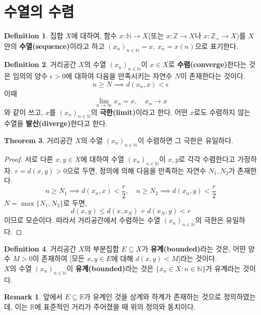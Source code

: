 \documentclass[11pt]{book}
\numberwithin{equation}{chapter}
\def\NN{\mathbb{N}}
\def\ZZ{\mathbb{Z}}
\def\RR{\mathbb{R}}
\def\eps{\epsilon}
\theoremstyle{definition}
\newtheorem{thm}{Theorem}[section]
\newtheorem{defn}[thm]{Definition}
\newtheorem*{rem}{Remark}
\begin{document}
\section{수열의 수렴}

    \begin{defn}
        집합 \(X\)에 대하여, 함수 \(x : \NN \to X\)(또는 \(x : \ZZ \to X\)나 \(x : \ZZ_+ \to X\))를 \(X\) 안의 \textbf{수열(sequence)}이라고 하고 \((x_n)_{n \in \NN} = x, \ x_n = x(n)\)으로 표기한다.
    \end{defn}
    \begin{defn}
        거리공간 \(X\)의 수열 \((x_n)_{n \in \NN}\)이 \(x \in X\)로 \textbf{수렴(converge)}한다는 것은 임의의 양수 \(\eps > 0\)에 대하여 다음을 만족시키는 자연수 \(N\)이 존재한다는 것이다.
        \[
        n \ge N \implies d(x_n, x) < \eps    
        \]
        이때
        \[
        \lim_{n \to \infty} x_n = x, \quad x_n \to x    
        \]
        와 같이 쓰고, \(x\)를 \((x_n)_{n \in \NN}\)의 \textbf{극한(limit)}이라고 한다. 어떤 \(x\)로도 수렴하지 않는 수열을 \textbf{발산(diverge)}한다고 한다.
    \end{defn}


    \begin{thm}
        거리공간 \(X\)의 수열 \((x_n)_{n \in \NN}\)이 수렴하면 그 극한은 유일하다.
    \end{thm}
    \begin{proof}
        서로 다른 \(x, y \in X\)에 대하여 수열 \((x_n)_{n \in \NN}\)이 \(x, y\)로 각각 수렴한다고 가정하자. \(r = d(x, y) > 0\)으로 두면, 정의에 의해 다음을 만족하는 자연수 \(N_1, N_2\)가 존재한다.
        \[
        n \ge N_1 \implies d(x_n, x) < \frac{r}{2}, \quad n \ge N_2 \implies d(x_n, y) < \frac{r}{2}
        \]
        \(N = \max \{N_1, N_2\}\)로 두면,
        \[
        d(x, y) \le d(x, x_N) + d(x_N, y) < r    
        \]
        이므로 모순이다. 따라서 거리공간에서 수렴하는 수열 \((x_n)_{n \in \NN}\)의 극한은 유일하다.
    \end{proof}

    \begin{defn}
        거리공간 \(X\)의 부분집합 \(E \subseteq X\)가 \textbf{유계(bounded)}라는 것은, 어떤 양수 \(M > 0\)이 존재하여 [모든 \(x, y \in E\)에 대해 \(d(x, y) < M\)]라는 것이다.\\
        \(X\)의 수열 \((x_n)_{n \in \NN}\)이 \textbf{유계(bounded)}라는 것은 \(\{x_n \in X: n \in \NN\}\)가 유계라는 것이다.
    \end{defn}

    \begin{rem}
        앞에서 \(E \subseteq \RR\)가 유계인 것을 상계와 하계가 존재하는 것으로 정의하였는데, 이는 \(\RR\)에 표준적인 거리가 주어졌을 때 위의 정의와 동치이다.
    \end{rem}
\end{document}
